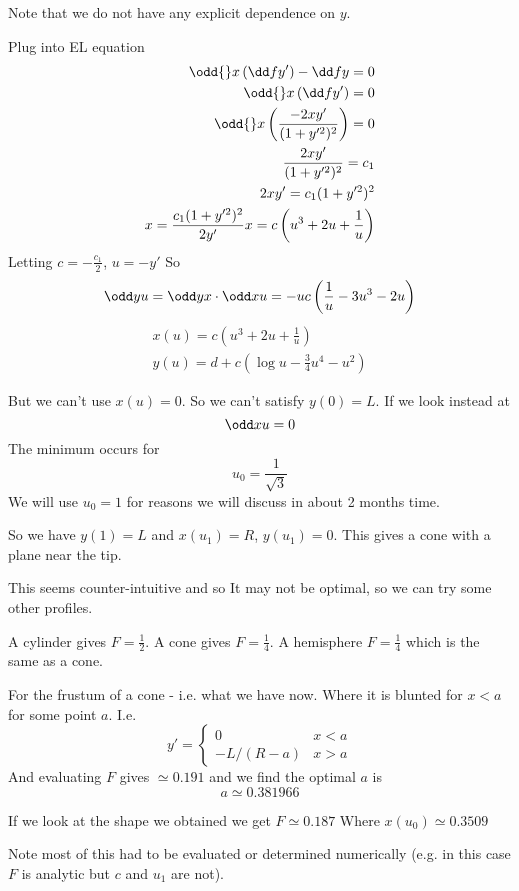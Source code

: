 \documentclass{E:/Documents/Latex/myassignment}
\begin{document}
Note that we do not have any explicit dependence on $y$.

Plug into EL equation
\begin{align*}
	\odd{}x \left(\dd f{y'}\right) - \dd fy = 0\\
	\odd{}x \left(\dd f{y'}\right)= 0\\
	\odd{}x \left(\frac{-2xy'}{(1+y'^2)^2}\right) = 0\\
	\frac{2xy'}{(1+y'^2)^2} = c_1\\
	2xy' = c_1(1+y'^2)^2\\
	x = \frac{c_1(1+y'^2)^2}{2y'}
 	x = c \left(u^3 + 2u + \frac1u\right)
\end{align*}
Letting $c = -\frac{c_1}{2}$, $u = - y'$
So
\[\odd yu = \odd yx \cdot \odd xu = -u c\left(\frac1u - 3u^3 - 2u\right)\]
\begin{align*}
	x(u) = c \left(u^3 + 2u + \frac1u\right)\\
	y(u) = d + c(\log u - \frac34 u^4 - u^2)
\end{align*}

But we can't use $x(u) = 0$. So we can't satisfy $y(0) = L$.
If we look instead at
\[\odd x u = 0\]
The minimum occurs for
\[u_0 = \frac{1}{\sqrt{3}}\]
We will use $u_0 = 1$ for reasons we will discuss in about 2 months time.

So we have $y(1) = L$ and $x(u_1) = R$, $y(u_1) = 0$.
This gives a cone with a plane near the tip.

This seems counter-intuitive and so It may not be optimal, so we can try some other profiles.

A cylinder gives $F = \frac12$. A cone gives $F = \frac14$. A hemisphere $F = \frac14$ which is the same as a cone.

For the frustum of a cone - i.e. what we have now. Where it is blunted for $x< a$ for some point $a$.
I.e.
\[y' = \begin{cases}
	0 & x<a\\
	-L/(R-a) & x>a
\end{cases}\]
And evaluating $F$ gives $\simeq 0.191$ and we find the optimal $a$ is
\[a \simeq 0.381966\]

If we look at the shape we obtained we get $F \simeq 0.187$
Where $x(u_0) \simeq 0.3509$

Note most of this had to be evaluated or determined numerically (e.g. in this case $F$ is analytic but $c$ and $u_1$ are not).
\end{document}
